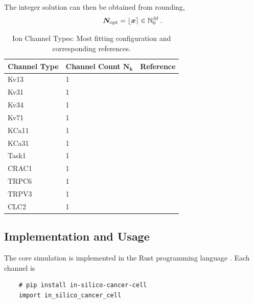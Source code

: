 \documentclass[USenglish,twocolumn]{article}
\begin{document}
  The integer solution can then be obtained from rounding,
  $${\bm{N}}_{\rm opt} = \lfloor {\bm{x}} \rceil \in \mathbb{N}_0^M\,.$$

  \begin{table}
    \caption{Ion Channel Types: Most fitting configuration and corresponding references.}
    \begin{tabular}{lll}
      \textbf{Channel Type} & \textbf{Channel Count $\bm{N_k}$} & \textbf{Reference}            \\
      \midrule
      Kv13                  & 1                                 & \cite{1998-potassium-channel} \\
      Kv31                  & 1                                 & \cite{1998-potassium-channel} \\
      Kv34                  & 1                                 & \cite{1998-potassium-channel} \\
      Kv71                  & 1                                 & \cite{1998-potassium-channel} \\
      KCa11                 & 1                                 & \cite{1998-potassium-channel} \\
      KCa31                 & 1                                 & \cite{1998-potassium-channel} \\
      Task1                 & 1                                 & \cite{1998-potassium-channel} \\
      CRAC1                 & 1                                 & \cite{1998-potassium-channel} \\
      TRPC6                 & 1                                 & \cite{1998-potassium-channel} \\
      TRPV3                 & 1                                 & \cite{1998-potassium-channel} \\
      CLC2                  & 1                                 & \cite{1998-potassium-channel} \\
    \end{tabular}
    \label{table:channel-types}
  \end{table}

  \subsection{Implementation and Usage}
  The core simulation is implemented in the Rust programming language \cite{2014-rust}.
  Each channel is

  \begin{verbatim}
    # pip install in-silico-cancer-cell
    import in_silico_cancer_cell
  \end{verbatim}
\end{document}
